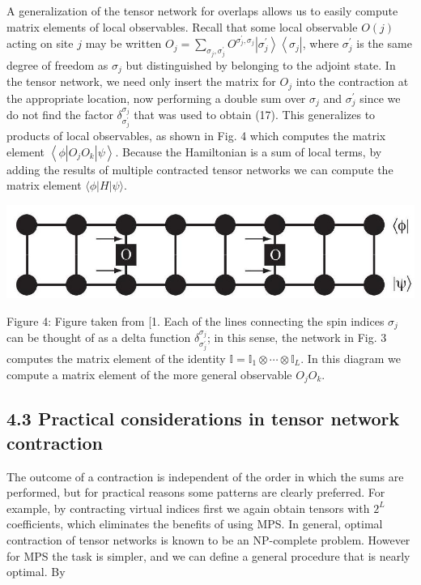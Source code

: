\documentclass[12pt]{article}
\begin{document}
A generalization of the tensor network for overlaps allows us to easily compute matrix elements of local observables. Recall that some local observable $O(j)$ acting on site $j$ may be written $O_{j}=\sum_{\sigma_{j}, \sigma_{j}^{\prime}} O^{\sigma_{j}^{\prime}, \sigma_{j}}\left|\sigma_{j}^{\prime}\right\rangle\left\langle\sigma_{j}\right|$, where $\sigma_{j}^{\prime}$ is the same degree of freedom as $\sigma_{j}$ but distinguished by belonging to the adjoint state. In the tensor network, we need only insert the matrix for $O_{j}$ into the contraction at the appropriate location, now performing a double sum over $\sigma_{j}$ and $\sigma_{j}^{\prime}$ since we do not find the factor $\delta_{\sigma_{j}^{\prime}}^{\sigma_{j}}$ that was used to obtain (17). This generalizes to products of local observables, as shown in Fig. 4 which computes the matrix element $\left\langle\phi\left|O_{j} O_{k}\right| \psi\right\rangle$. Because the Hamiltonian is a sum of local terms, by adding the results of multiple contracted tensor networks we can compute the matrix element $\langle\phi|H| \psi\rangle$.

\begin{center}
\includegraphics[max width=\textwidth]{2024_04_17_aea350b0a5e2209a42f2g-08}
\end{center}

Figure 4: Figure taken from [1. Each of the lines connecting the spin indices $\sigma_{j}$ can be thought of as a delta function $\delta_{\sigma_{j}^{\prime}}^{\sigma_{j}}$; in this sense, the network in Fig. 3 computes the matrix element of the identity $\mathbb{I}=\mathbb{I}_{1} \otimes \cdots \otimes \mathbb{I}_{L}$. In this diagram we compute a matrix element of the more general observable $O_{j} O_{k}$.

\subsection*{4.3 Practical considerations in tensor network contraction}
The outcome of a contraction is independent of the order in which the sums are performed, but for practical reasons some patterns are clearly preferred. For example, by contracting virtual indices first we again obtain tensors with $2^{L}$ coefficients, which eliminates the benefits of using MPS. In general, optimal contraction of tensor networks is known to be an NP-complete problem. However for MPS the task is simpler, and we can define a general procedure that is nearly optimal. By
\end{document}
